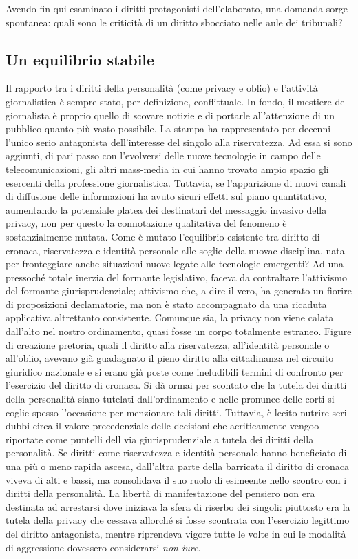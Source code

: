 Avendo fin qui esaminato i diritti protagonisti dell'elaborato, una domanda sorge spontanea: quali sono le criticità di un diritto sbocciato nelle aule dei tribunali?

\subsection{Un equilibrio stabile}

Il rapporto tra i diritti della personalità (come privacy e oblio) e l'attività giornalistica è sempre stato, per definizione, conflittuale.
In fondo, il mestiere del giornalista è proprio quello di scovare notizie e di portarle all'attenzione di un pubblico quanto più vasto possibile.
La stampa ha rappresentato per decenni l'unico serio antagonista dell'interesse del singolo alla riservatezza. Ad essa si sono aggiunti, di pari passo con l'evolversi delle nuove tecnologie in campo delle telecomunicazioni, gli altri mass-media in cui hanno trovato ampio spazio gli esercenti della professione giornalistica. Tuttavia, se l'apparizione di nuovi canali di diffusione delle informazioni ha avuto sicuri effetti sul piano quantitativo, aumentando la potenziale platea dei destinatari del messaggio invasivo della privacy, non per questo la connotazione qualitativa del fenomeno è sostanzialmente mutata.
Come è mutato l'equilibrio esistente tra diritto di cronaca, riservatezza e identità personale alle soglie della nuovac disciplina, nata per fronteggiare anche situazioni nuove legate alle tecnologie emergenti?
Ad una pressoché totale inerzia del formante legislativo, faceva da contraltare l'attivismo del formante giurisprudenziale; attivismo che, a dire il vero, ha generato un fiorire di proposizioni declamatorie, ma non è stato accompagnato da una ricaduta applicativa altrettanto consistente.
Comunque sia, la privacy non viene calata dall'alto nel nostro ordinamento, quasi fosse un corpo totalmente estraneo. Figure di creazione pretoria, quali il diritto alla riservatezza, all'identità personale o all'oblio, avevano già guadagnato il pieno diritto alla cittadinanza nel circuito giuridico nazionale e si erano già poste come ineludibili termini di confronto per l'esercizio del diritto di cronaca.
Si dà ormai per scontato che la tutela dei diritti della personalità siano tutelati dall'ordinamento e nelle pronunce delle corti si coglie spesso  l'occasione per menzionare tali diritti. Tuttavia, è lecito nutrire seri dubbi circa il valore precedenziale delle decisioni che acriticamente vengoo riportate come puntelli dell via giurisprudenziale a tutela dei diritti della personalità.
Se diritti come riservatezza e identità personale hanno beneficiato di una più o meno rapida ascesa, dall'altra parte della barricata il diritto di cronaca viveva di alti e bassi, ma consolidava il suo ruolo di esimeente nello scontro con i diritti della personalità.
La libertà di manifestazione del pensiero non era destinata ad arrestarsi dove iniziava la sfera di riserbo dei singoli: piuttosto era la tutela della privacy che cessava allorché si fosse scontrata con l'esercizio legittimo del diritto antagonista, mentre riprendeva vigore tutte le volte in cui le modalità di aggressione dovessero considerarsi \textit{non iure}.

